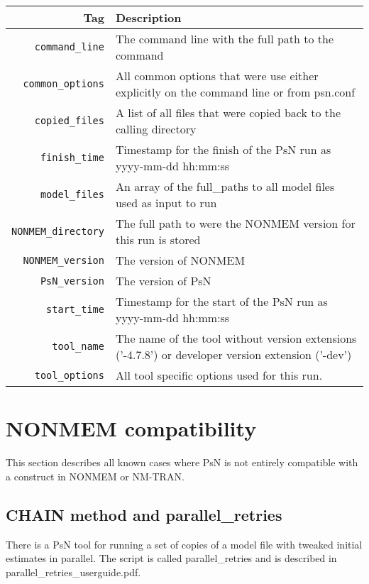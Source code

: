	\begin{center}
		\begin{tabularx}{\linewidth}{ r X }
			\hline
			Tag & Description \\ \hline
			\verb|command_line| & The command line with the full path to the command \\ \hline
			\verb|common_options| & All common options that were use either explicitly on the command line or from psn.conf \\ \hline
			\verb|copied_files| & A list of all files that were copied back to the calling directory \\ \hline
			\verb|finish_time| & Timestamp for the finish of the PsN run as yyyy-mm-dd hh:mm:ss \\ \hline
			\verb|model_files| & An array of the full\_paths to all model files used as input to run \\ \hline
			\verb|NONMEM_directory| & The full path to were the NONMEM version for this run is stored \\ \hline
			\verb|NONMEM_version| & The version of NONMEM \\ \hline
			\verb|PsN_version| & The version of PsN \\ \hline
			\verb|start_time| & Timestamp for the start of the PsN run as yyyy-mm-dd hh:mm:ss \\ \hline
			\verb|tool_name| & The name of the tool without version extensions \mbox{('-4.7.8')} or developer version extension ('-dev') \\ \hline
			\verb|tool_options| & All tool specific options used for this run. \\ \hline
		\end{tabularx}
	\end{center}
	
	
	
	\section{NONMEM compatibility}
	
	This section describes all known cases where PsN is not entirely compatible with a construct in NONMEM or NM-TRAN.
	
	\subsection{CHAIN method and parallel\_retries}
	
	There is a PsN tool for running a set of copies of a model file with tweaked initial estimates in parallel. The script is called parallel\_retries and is described in parallel\_retries\_userguide.pdf.
	
